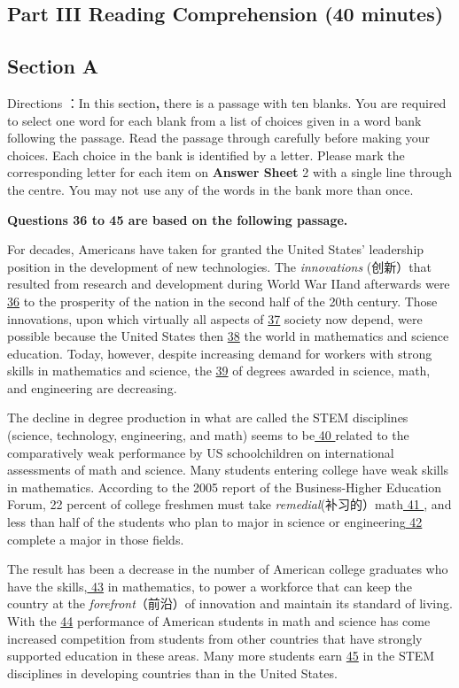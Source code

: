 \documentclass[UTF8,11pt]{ctexart}
\begin{document}
\subsection*{Part III Reading Comprehension (40 minutes)}


\subsection*{\textbf{Section A}}


Directions ：In this section\textbf{,} there is a passage with ten blanks. You are required to select one word for each blank from a list of choices given in a word bank following the passage. Read the passage through carefully before making your choices. Each choice in the bank is identified by a letter. Please mark the corresponding letter for each item on \textbf{Answer Sheet} 2 with a single line through the centre. You may not use any of the words in the bank more than once.


\textbf{Questions 36 to 45 are based on the following passage.}


For decades, Americans have taken for granted the United States’ leadership position in the development of new technologies. The\textit{ innovations} (创新）that resulted from research and development during World War IIand afterwards were \uline{36} to the prosperity of the nation in the second half of the 20th century. Those innovations, upon which virtually all aspects of \uline{37} society now depend, were possible because the United States then \uline{38} the world in mathematics and science education. Today, however, despite increasing demand for workers with strong skills in mathematics and science, the \uline{39} of degrees awarded in science, math, and engineering are decreasing.


The decline in degree production in what are called the STEM disciplines (science, technology, engineering, and math) seems to be\uline{ 40 }related to the comparatively weak performance by US schoolchildren on international assessments of math and science. Many students entering college have weak skills in mathematics. According to the 2005 report of the Business-Higher Education Forum, 22 percent of college freshmen must take\textit{ remedial}(补习的）math\uline{ 41 }, and less than half of the students who plan to major in science or engineering\uline{ 42 }complete a major in those fields.


The result has been a decrease in the number of American college graduates who have the skills,\uline{ 43} in mathematics, to power a workforce that can keep the country at the\textit{ forefront}（前沿）of innovation and maintain its standard of living. With the \uline{44} performance of American students in math and science has come increased competition from students from other countries that have strongly supported education in these areas. Many more students earn \uline{45} in the STEM disciplines in developing countries than in the United States.
\end{document}
